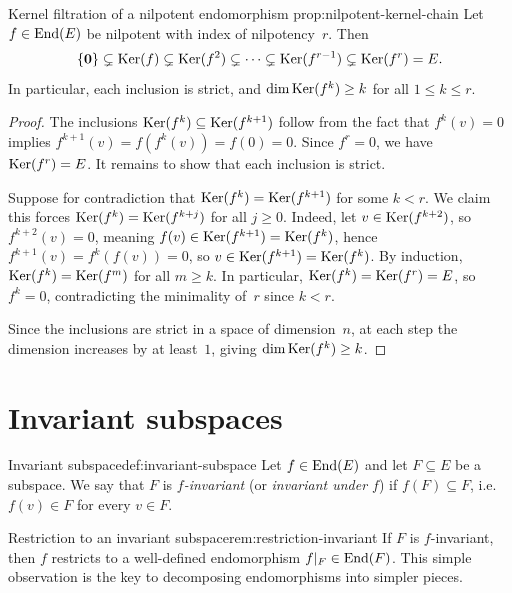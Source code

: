 \begin{proposition}{Kernel filtration of a nilpotent endomorphism}%
{prop:nilpotent-kernel-chain}
Let $f \in \operatorname{End}(E)$ be nilpotent with index of nilpotency~$r$.  Then
\[
  \left\{\mathbf{0}\right\}
  \subsetneq \operatorname{Ker}(f)
  \subsetneq \operatorname{Ker}(f^2)
  \subsetneq \cdots
  \subsetneq \operatorname{Ker}(f^{r-1})
  \subsetneq \operatorname{Ker}(f^r)
  = E.
\]
In particular, each inclusion is strict, and $\dim\operatorname{Ker}(f^k) \geq k$
for all $1 \leq k \leq r$.
\end{proposition}

\begin{proof}
The inclusions $\operatorname{Ker}(f^k) \subseteq \operatorname{Ker}(f^{k+1})$ follow from the
fact that $f^k(v) = 0$ implies $f^{k+1}(v) = f(f^k(v)) = f(0) = 0$.
Since $f^r = 0$, we have $\operatorname{Ker}(f^r) = E$.  It remains to show that
each inclusion is strict.

Suppose for contradiction that $\operatorname{Ker}(f^k) = \operatorname{Ker}(f^{k+1})$ for
some $k < r$.  We claim this forces $\operatorname{Ker}(f^k) = \operatorname{Ker}(f^{k+j})$
for all $j \geq 0$.  Indeed, let $v \in \operatorname{Ker}(f^{k+2})$, so
$f^{k+2}(v) = 0$, meaning $f(v) \in \operatorname{Ker}(f^{k+1}) = \operatorname{Ker}(f^k)$,
hence $f^{k+1}(v) = f^k(f(v)) = 0$, so $v \in \operatorname{Ker}(f^{k+1}) =
\operatorname{Ker}(f^k)$.  By induction, $\operatorname{Ker}(f^k) = \operatorname{Ker}(f^m)$ for all
$m \geq k$.  In particular, $\operatorname{Ker}(f^k) = \operatorname{Ker}(f^r) = E$, so
$f^k = 0$, contradicting the minimality of~$r$ since $k < r$.

Since the inclusions are strict in a space of dimension~$n$, at
each step the dimension increases by at least~$1$, giving
$\dim\operatorname{Ker}(f^k) \geq k$.
\end{proof}


\section{Invariant subspaces}\label{sec:invariant-subspaces}

\begin{definition}{Invariant subspace}{def:invariant-subspace}
Let $f \in \operatorname{End}(E)$ and let $F \subseteq E$ be a subspace.
We say that $F$ is \emph{$f$-invariant} (or \emph{invariant under
$f$}) if $f(F) \subseteq F$, i.e.\ $f(v) \in F$ for every $v \in F$.
\end{definition}

\begin{remark}{Restriction to an invariant subspace}{rem:restriction-invariant}
If $F$ is $f$-invariant, then $f$ restricts to a well-defined
endomorphism $f{|_{F}} \in \operatorname{End}(F)$.  This simple observation is
the key to decomposing endomorphisms into simpler pieces.
\end{remark}

